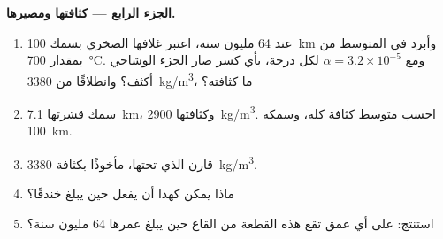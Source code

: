 \begin{problem}
\medskip
\noindent\textbf{الجزء الرابع --- كثافتها ومصيرها.}
\begin{enumerate}[resume]
  \item عند 64 مليون سنة، اعتبر غلافها الصخري بسمك \qty{100}{km}
        وأبرد في المتوسط من  بمقدار \qty{700}{\celsius}. ومع
        $\alpha = 3.2 \times 10^{-5}$ لكل درجة، بأي كسر صار
        الجزء الوشاحي أكثف؟ وانطلاقًا من \qty{3380}{kg/m^3}، ما
        كثافته؟
  \item سمك قشرتها \qty{7.1}{km}، وكثافتها
        \qty{2900}{kg/m^3}. احسب متوسط كثافة
         كله، وسمكه \qty{100}{km}.
  \item قارن  الذي تحتها، مأخوذًا بكثافة
        \qty{3380}{kg/m^3}.
  \item ماذا يمكن  كهذا أن يفعل حين يبلغ خندقًا؟
  \item استنتج: على أي عمق تقع هذه القطعة من القاع حين يبلغ عمرها 64
        مليون سنة؟
\end{enumerate}
\end{problem}
